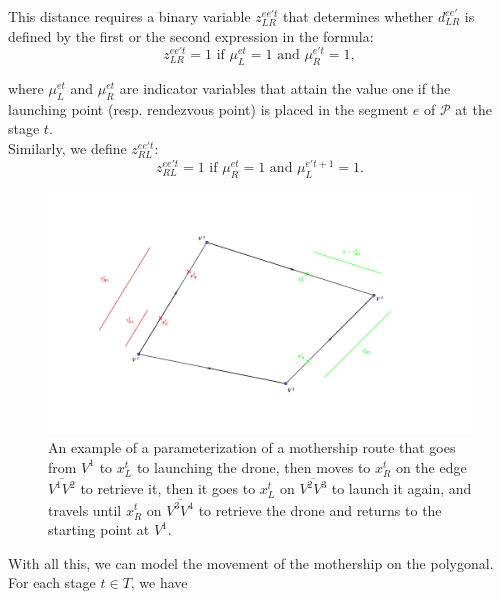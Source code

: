 \noindent
This distance requires a binary variable $z_{LR}^{ee't}$ that determines whether $d_{LR}^{ee'}$ is defined by the first or the second expression in the formula:
$$z_{LR}^{ee't} = 1 \text{ if } \mu_{L}^{et} = 1 \text{ and }\mu_{R}^{e't} = 1,$$

\noindent where $\mu_{L}^{et}$ and $\mu_{R}^{et}$ are indicator variables that attain the value one if the launching point (resp. rendezvous point) is placed in the segment $e$ of $\mathcal P$ at the stage $t$.\\
\noindent
Similarly, we define $z_{RL}^{ee't}$:
$$z_{RL}^{ee't} = 1 \text{ if } \mu_{R}^{et} = 1 \text{ and }\mu_{L}^{e't+1} = 1.$$


\begin{figure}[h!]
\begin{center}
 \includegraphics[width=1\linewidth]{PMDRPG.png}
\end{center}
\caption{An example of a parameterization of a mothership route that goes from $V^1$ to $x_L^t$ to launching the drone, then moves to $x_R^t$ on the edge $\overline{V^1V^2}$ to retrieve it, then it goes to $x_L^t$ on $\overline{V^2V^3}$ to launch it again, and travels until $x_R^t$ on $\overline{V^3V^4}$ to retrieve the drone and returns to the starting point at $V^1$.\label{fig:ex1}}
\end{figure}
\noindent
With all this, we can model the movement of the mothership on the polygonal. For each stage $t\in T$, we have

